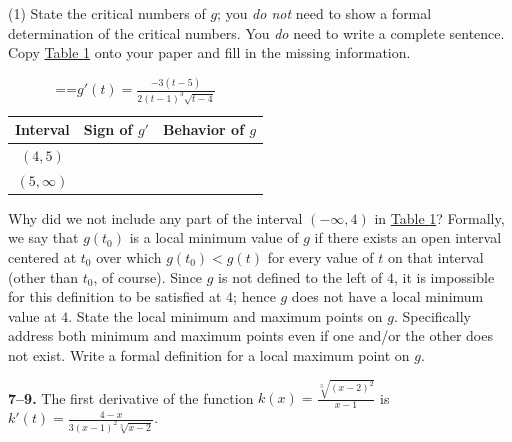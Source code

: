 \documentclass[10pt,oneside,]{book}
\newcommand{\lt}{<}
\theoremstyle{plain}
\theoremstyle{definition}
\numberwithin{equation}{section}
\newcommand{\fe}[2]{#1\mathopen{}\left(#2\right)\mathclose{}}
\newcommand{\ointerval}[2]{\left(#1,#2\right)}
\newcommand{\fd}[1]{#1'}
\begin{document}
\begin{exercisegroup}(1)
\exercise[2.]\hypertarget{exercise-583}{\null}State the critical numbers of \(g\); you \emph{do not} need to show a formal determination of the critical numbers.  You \emph{do} need to write a complete sentence.%
\exercise[3.]\hypertarget{exercise-584}{\null}Copy \hyperref[table-semi-rational-sign-table]{Table \ref{table-semi-rational-sign-table}} onto your paper and fill in the missing information.%
\begin{table}
\centering
\caption{\binoppenalty=\maxdimen \relpenalty=\maxdimen \(\fe{\fd{g}}{t}=\frac{-3(t-5)}{2(t-1)^3\sqrt{t-4}}\)\label{table-semi-rational-sign-table}}
\begin{tabular}{cp{1.5in}p{1.5in}}
\toprule
Interval&\multicolumn{1}{c}{Sign of \(\fd{g}\)}&\multicolumn{1}{c}{Behavior of \(g\)}\\
\midrule
\(\ointerval{4}{5}\)&&\\
\midrule
\(\ointerval{5}{\infty}\)&&\\
\bottomrule
\end{tabular}
\end{table}
\exercise[4.]\hypertarget{exercise-585}{\null}Why did we not include any part of the interval \(\ointerval{-\infty}{4}\) in \hyperref[table-semi-rational-sign-table]{Table \ref{table-semi-rational-sign-table}}?%
\exercise[5.]\hypertarget{exercise-586}{\null}Formally, we say that \(\fe{g}{t_0}\) is a local minimum value of \(g\) if there exists an open interval centered at \(t_0\) over which \(\fe{g}{t_0}\lt\fe{g}{t}\) for every value of \(t\) on that interval (other than \(t_0\), of course).  Since \(g\) is not defined to the left of \(4\), it is impossible for this definition to be satisfied at \(4\); hence \(g\) does not have a local minimum value at \(4\). State the local minimum and maximum points on \(g\).  Specifically address both minimum and maximum points even if one and/or the other does not exist.%
\exercise[6.]\hypertarget{exercise-587}{\null}Write a formal definition for a local maximum point on \(g\).%
\end{exercisegroup}
\par\smallskip\noindent
\textbf{7--9. }\hypertarget{exercisegroup-114}{\null}The first derivative of the function \(\fe{k}{x}=\frac{\sqrt[3]{(x-2)^2}}{x-1}\) is \(\fe{\fd{k}}{t}=\frac{4-x}{3(x-1)^2\sqrt[3]{x-2}}\).%
\par
\end{document}
